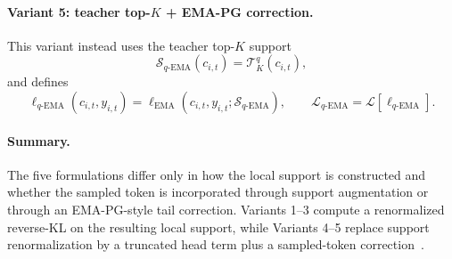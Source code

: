 \documentclass{article}
\begin{document}
\paragraph{Variant 5: teacher top-$K$ + EMA-PG correction.}
This variant instead uses the teacher top-$K$ support
\[
\mathcal S_{q\text{-EMA}}(c_{i,t}) = \mathcal T_K^q(c_{i,t}),
\]
and defines
\[
\ell_{q\text{-EMA}}(c_{i,t}, y_{i,t})
=
\ell_{\mathrm{EMA}}(c_{i,t}, y_{i,t}; \mathcal S_{q\text{-EMA}}),
\qquad
\mathcal L_{q\text{-EMA}} = \mathcal L[\ell_{q\text{-EMA}}].
\]

\paragraph{Summary.}
The five formulations differ only in how the local support is constructed and whether the sampled token is incorporated through support augmentation or through an EMA-PG-style tail correction. Variants 1--3 compute a renormalized reverse-KL on the resulting local support, while Variants 4--5 replace support renormalization by a truncated head term plus a sampled-token correction~\citep{emapg2026}.
\end{document}
